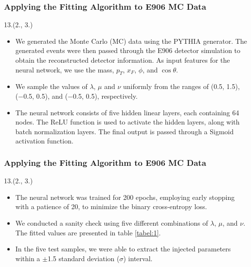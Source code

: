 \documentclass[12pt, xcolor={dvipsnames}, aspectratio = 169, sans,mathserif]{beamer}
\newenvironment{List}[2]
{\begin{textblock}{#1}#2
\begin{itemize}}
{\end{itemize}
\end{textblock}}
\newcommand{\NPcite}[1]{{\tiny \footfullcite{#1}}}
\begin{document}
\begin{frame}
\frametitle{Applying the Fitting Algorithm to E906 MC Data}

\begin{List}{13.}{(2., 3.)}

  \item We generated the Monte Carlo (MC) data using the PYTHIA generator. The generated events were then passed through
  the E906 detector simulation to obtain the reconstructed detector information. As input features for the neural network,
  we use the mass, $p_{T}$, $x_{F}$, $\phi$, and $\cos\theta$.

  \item We sample the values of $\lambda$, $\mu$ and $\nu$ uniformly  from the ranges of (0.5, 1.5), (−0.5, 0.5), and
  (−0.5, 0.5), respectively.\NPcite{NuSea:2006gvb}

  \item The neural network consists of five hidden linear layers, each containing 64 nodes. The ReLU function is used
  to activate the hidden layers, along with batch normalization layers. The final output is passed through a Sigmoid activation function.

\end{List}

\end{frame}

\begin{frame}
\frametitle{Applying the Fitting Algorithm to E906 MC Data}

\begin{List}{13.}{(2., 3.)}

  \item The neural network was trained for 200 epochs, employing early stopping with a patience of 20, to minimize the
  binary cross-entropy loss.

  \item We conducted a sanity check using five different combinations of $\lambda$, $\mu$, and $\nu$. The fitted values
  are presented in table \ref{tabel:1}.

  \item In the five test samples, we were able to extract the injected parameters within a $\pm$1.5 standard deviation ($\sigma$) interval.

\end{List}

\end{frame}
\end{document}
